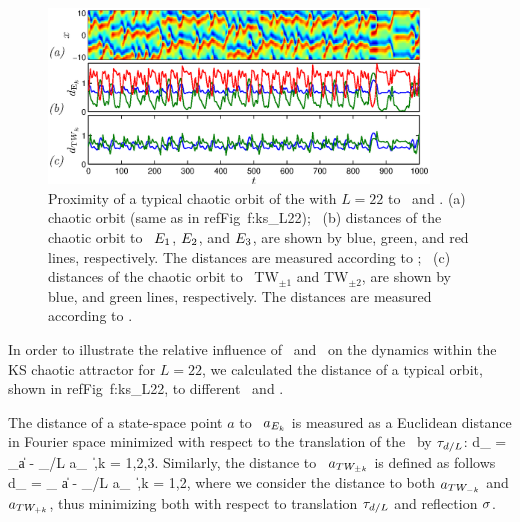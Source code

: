 \begin{figure}[t]
\begin{center}
\includegraphics[width=0.9\textwidth, clip=true]{../figs/ks_prox_eq_tw.eps}
\end{center}
\caption{\color{blue}
Proximity of a typical chaotic orbit of the \KSe with $L =
22$ to \eqva\ and \reqva. (a) chaotic orbit (same as in
refFig~{f:ks\_L22}); ~(b) distances of the chaotic orbit to
\eqva\ $E_{1}$, $E_{2}$, and $E_{3}$, are shown by
blue, green, and red lines, respectively. The distances are
measured according to ; ~(c) distances of
the chaotic orbit to \reqva\ TW$_{\pm 1}$ and TW$_{\pm 2}$,
are shown by blue, and green lines, respectively. The
distances are measured according to .
     } \label{f:ks_prox_eq}
\end{figure}



In order to illustrate the relative influence of \eqva\ and \reqva\ on the dynamics
within the KS chaotic attractor for $L = 22$, we calculated the distance of a
typical orbit, shown in refFig~{f:ks\_L22}, to different \eqva\ and \reqva .

The distance of a state-space point $a$ to \eqv\ $a_{E_{k}}$ is measured as a
Euclidean distance in Fourier space minimized with respect to the translation
of the \eqv\ by $\tau_{d/L}$:
\beq
  d_{} = \min_\shift \|a - \Shift_{\shift/L} a_{} \|\,,\quad k = 1,2,3.
Similarly, the distance to \reqv\ $a_{TW_{\pm k}}$ is defined as follows
\beq
  d_{} = \min_{\shift} \|a - \Shift_{\shift/L} a_{} \|\,,\quad k = 1,2,
where we consider the distance to both $a_{TW_{-k}}$ and $a_{TW_{+k}}$, thus
minimizing both with respect to translation $\tau_{d/L}$ and reflection $\sigma$.

